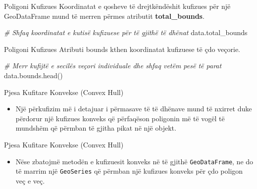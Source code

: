 \documentclass[
  ignorenonframetext,
]{beamer}
\newenvironment{Shaded}{\begin{snugshade}}{\end{snugshade}}
\newcommand{\CommentTok}[1]{\textcolor[rgb]{0.56,0.35,0.01}{\textit{#1}}}
\newcommand{\NormalTok}[1]{#1}
\providecommand{\tightlist}{%
  \setlength{\itemsep}{0pt}\setlength{\parskip}{0pt}}
\begin{document}
\begin{frame}[fragile]{Poligoni Kufizues}
\protect\hypertarget{poligoni-kufizues-4}{}
Koordinatat e qosheve të drejtkëndëshit kufizues për një GeoDataFrame
mund të merren përmes atributit \textbf{total\_bounds}.


\begin{Shaded}
\begin{Highlighting}[]
\CommentTok{\# Shfaq koordinatat e kutisë kufizuese për të gjithë të dhënat}
\NormalTok{data.total\_bounds}
\end{Highlighting}
\end{Shaded}
\end{frame}

\begin{frame}[fragile]{Poligoni Kufizues}
\protect\hypertarget{poligoni-kufizues-5}{}
Atributi bounds kthen koordinatat kufizuese të çdo veçorie.


\begin{Shaded}
\begin{Highlighting}[]
\CommentTok{\# Merr kufijtë e secilës veçori individuale dhe shfaq vetëm pesë të parat}
\NormalTok{data.bounds.head()}
\end{Highlighting}
\end{Shaded}
\end{frame}

\begin{frame}{Pjesa Kufitare Konvekse (Convex Hull)}
\protect\hypertarget{pjesa-kufitare-konvekse-convex-hull}{}
\begin{itemize}
\tightlist
\item
  Një përkufizim më i detajuar i përmasave të të dhënave mund të nxirret
  duke përdorur një kufizues konveks që përfaqëson poligonin më të vogël
  të mundshëm që përmban të gjitha pikat në një objekt.
\end{itemize}
\end{frame}

\begin{frame}[fragile]{Pjesa Kufitare Konvekse (Convex Hull)}
\protect\hypertarget{pjesa-kufitare-konvekse-convex-hull-1}{}
\begin{itemize}
\tightlist
\item
  Nëse zbatojmë metodën e kufizuesit konveks në të gjithë
  \texttt{GeoDataFrame}, ne do të marrim një \texttt{GeoSeries} që
  përmban një kufizues konveks për çdo poligon veç e veç.
\end{itemize}
\end{frame}
\end{document}
